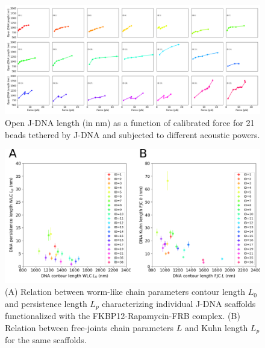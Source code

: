 \documentclass{biophys-new}
\begin{document}
\begin{figure}
	\centering
	\centerline {\includegraphics[width=1\linewidth]{Figures/Force_Lengths_Bis_Rapa.png}}
	\caption{Open J-DNA length (in nm) as a function of calibrated force for 21 beads tethered by J-DNA and subjected to different acoustic powers.
	}
	\label{fig:ForceLength}	
\end{figure}

\begin{figure}[hbt!]
	\centering
	\includegraphics[width=1\linewidth]{Figures/fig_WLC_FJC.png}
	\caption{(A) Relation between worm-like chain parameters contour length $L_0$ and persistence length $L_p$ characterizing individual J-DNA scaffolds functionalized with the FKBP12-Rapamycin-FRB complex. (B) Relation between free-joints chain parameters $L$ and Kuhn length $L_p$ for the same scaffolds. }
	\label{fig:Lp_vs_L0}	
\end{figure}
\end{document}
